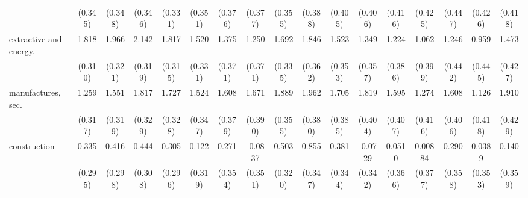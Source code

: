 {\begin{tabular}{l*{16}{c}}
                    &     (0.345)         &     (0.348)         &     (0.346)         &     (0.331)         &     (0.351)         &     (0.376)         &     (0.377)         &     (0.355)         &     (0.388)         &     (0.405)         &     (0.406)         &     (0.416)         &     (0.425)         &     (0.447)         &     (0.426)         &     (0.418)         \\
[1em]
extractive and energy.&       1.818\sym{***}&       1.966\sym{***}&       2.142\sym{***}&       1.817\sym{***}&       1.520\sym{***}&       1.375\sym{***}&       1.250\sym{***}&       1.692\sym{***}&       1.846\sym{***}&       1.523\sym{***}&       1.349\sym{***}&       1.224\sym{**} &       1.062\sym{**} &       1.246\sym{**} &       0.959\sym{*}  &       1.473\sym{***}\\
                    &     (0.310)         &     (0.321)         &     (0.319)         &     (0.315)         &     (0.331)         &     (0.371)         &     (0.371)         &     (0.335)         &     (0.362)         &     (0.353)         &     (0.357)         &     (0.386)         &     (0.399)         &     (0.442)         &     (0.445)         &     (0.427)         \\
[1em]
manufactures, sec.  &       1.259\sym{***}&       1.551\sym{***}&       1.817\sym{***}&       1.727\sym{***}&       1.524\sym{***}&       1.608\sym{***}&       1.671\sym{***}&       1.889\sym{***}&       1.962\sym{***}&       1.705\sym{***}&       1.819\sym{***}&       1.595\sym{***}&       1.274\sym{**} &       1.608\sym{***}&       1.126\sym{**} &       1.910\sym{***}\\
                    &     (0.317)         &     (0.319)         &     (0.329)         &     (0.328)         &     (0.347)         &     (0.379)         &     (0.390)         &     (0.355)         &     (0.380)         &     (0.385)         &     (0.404)         &     (0.407)         &     (0.416)         &     (0.406)         &     (0.418)         &     (0.429)         \\
[1em]
construction        &       0.335         &       0.416         &       0.444         &       0.305         &       0.122         &       0.271         &     -0.0837         &       0.503         &       0.855\sym{*}  &       0.381         &     -0.0729         &      0.0510         &     0.00884         &       0.290         &      0.0389         &       0.140         \\
                    &     (0.295)         &     (0.298)         &     (0.308)         &     (0.296)         &     (0.319)         &     (0.354)         &     (0.351)         &     (0.320)         &     (0.347)         &     (0.344)         &     (0.342)         &     (0.366)         &     (0.377)         &     (0.358)         &     (0.353)         &     (0.359)         \\

\end{tabular}}
